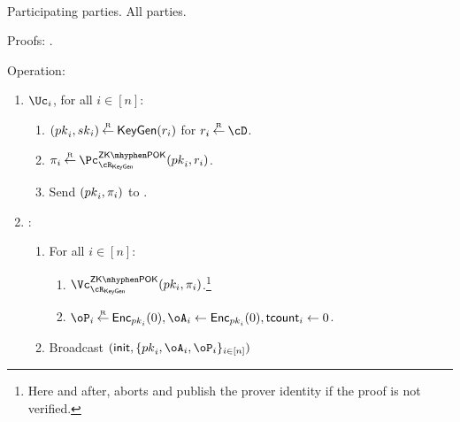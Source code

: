 \begin{protocol}~\label{prot:ConfidentialTransactions:Init}
	

	\item[Participating parties.] All parties.
			
			
	\item[Proofs:]   \piZKPOK{\rKeyGen}. 
	
	
			
\item[Operation:] ~
			
			
			\begin{enumerate}
				
				\item   $\Uc_i$, for  all $i\in [n]$:
				\begin{enumerate}
					\item  $({pk}_i,{sk}_i) \mathbin{\stackrel{\mbox{\tiny R}}{\leftarrow}} \mathsf{KeyGen}(r_i)$ for $r_i \getsr \cD$.
					
					
					\item  $\pi_i \getsr \pZKPOK{\rKeyGen}(\pk_i,r_i)$.
					
					\item Send $({pk}_i,\pi_i)$ to \Cc.
					
					
				\end{enumerate}
				
				\item \Cc: ~
				
				\begin{enumerate}
				
				\item For all $i\in [n]$: 
				
				\begin{enumerate}
					\item 	 $\vZKPOK{\rKeyGen}(pk_i,\pi_i)$.\footnote{Here and after,  \Cc aborts and publish the prover identity if the   proof is not verified.}
					
					\item $\oP_i\getsr \Enc_{\pk_i}(0),\oA_i\asn \Enc_{\pk_i}(0),\tcount_i 
					\asn 0$.
					
			
				\end{enumerate}
			
		\item Broadcast $(\init,\sset{\pk_i,\oA_i,\oP_i}_{i\in [n]})$
				\end{enumerate}								
			\end{enumerate}
\end{protocol}

